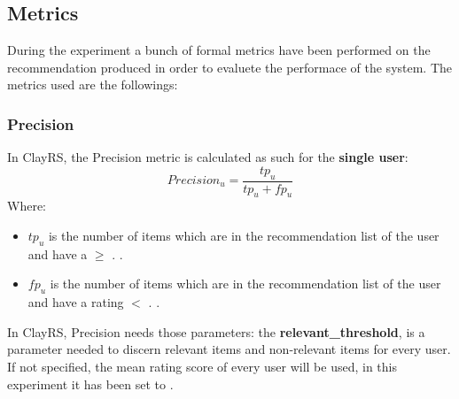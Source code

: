 \documentclass[11pt]{article}
\begin{document}
\subsection{Metrics}\label{subsec:metrics}
During the experiment a bunch of formal metrics have been performed on the recommendation produced in order to evaluete
the performace of the system.
The metrics used are the followings:
\hfill\break
\hfill\break



\subsubsection{Precision}\label{sec:precision}
In ClayRS, the Precision metric is calculated as such for the \textbf{single user}:
\hfill\break
\hfill\break
    \[
         Precision_u = \frac{tp_u}{tp_u + fp_u}
    \]
\hfill\break
\hfill\break
    Where:
\begin{itemize}
    \item $tp_u$ is the number of items which are in the recommendation list of the user and have a
       $\geq$ 
        \textbf{}.
        \textbf{}.
    \item $fp_u$ is the number of items which are in the recommendation list of the user and have a
      rating $<$ 
        \textbf{}.
        \textbf{}.
\end{itemize}
\hfill\break
\hfill\break
In ClayRS, Precision needs those parameters:
the \textbf{relevant\_threshold}, is a parameter needed to discern relevant items and non-relevant items for every user.
If not specified, the mean rating score of every user will be used, in this experiment it has been set to
\textbf{}.
\hfill\break
\hfill\break
\end{document}
